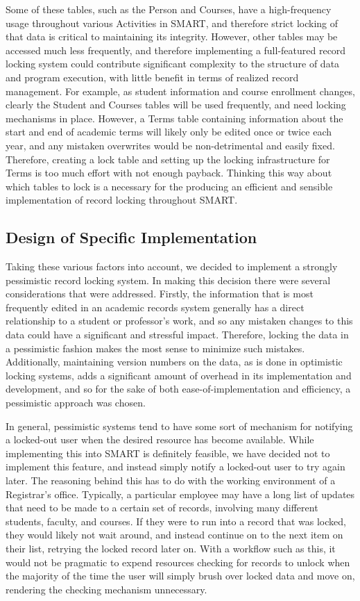\documentclass[12pt]{article}
\begin{document}
Some of these tables, such as the Person and Courses, have a high-frequency usage throughout various Activities in SMART, and therefore strict locking of that data is critical to maintaining its integrity. However, other tables may be accessed much less frequently, and therefore implementing a full-featured record locking system could contribute significant complexity to the structure of data and program execution, with little benefit in terms of realized record management. For example, as student information and course enrollment changes, clearly the Student and Courses tables will be used frequently, and need locking mechanisms in place. However, a Terms table containing information about the start and end of academic terms will likely only be edited once or twice each year, and any mistaken overwrites would be non-detrimental and easily fixed. Therefore, creating a lock table and setting up the locking infrastructure for Terms is too much effort with not enough payback. Thinking this way about which tables to lock is a necessary for the producing an efficient and sensible implementation of record locking throughout SMART.

\subsection{Design of Specific Implementation}

Taking these various factors into account, we decided to implement a strongly pessimistic record locking system. In making this decision there were several considerations that were addressed. Firstly, the information that is most frequently edited in an academic records system generally has a direct relationship to a student or professor’s work, and so any mistaken changes to this data could have a significant and stressful impact. Therefore, locking the data in a pessimistic fashion makes the most sense to minimize such mistakes. Additionally, maintaining version numbers on the data, as is done in optimistic locking systems, adds a significant amount of overhead in its implementation and development, and so for the sake of both ease-of-implementation and efficiency, a pessimistic approach was chosen.

In general, pessimistic systems tend to have some sort of mechanism for notifying a locked-out user when the desired resource has become available. While implementing this into SMART is definitely feasible, we have decided not to implement this feature, and instead simply notify a locked-out user to try again later. The reasoning behind this has to do with the working environment of a Registrar’s office. Typically, a particular employee may have a long list of updates that need to be made to a certain set of records, involving many different students, faculty, and courses. If they were to run into a record that was locked, they would likely not wait around, and instead continue on to the next item on their list, retrying the locked record later on. With a workflow such as this, it would not be pragmatic to expend resources checking for records to unlock when the majority of the time the user will simply brush over locked data and move on, rendering the checking mechanism unnecessary.
\end{document}
